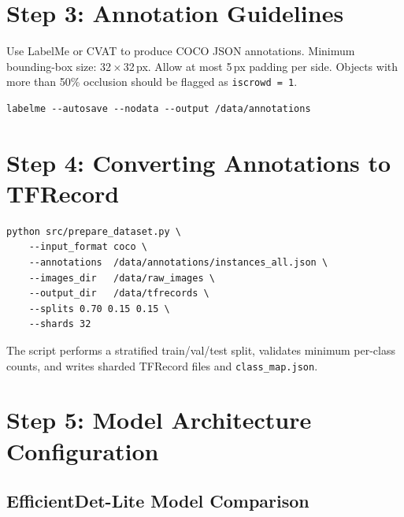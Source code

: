 \documentclass[11pt,a4paper]{article}
\begin{document}
\section{Step 3: Annotation Guidelines}

Use LabelMe or CVAT to produce COCO JSON annotations.
Minimum bounding-box size: 32\,$\times$\,32\,px. Allow at most 5\,px padding per
side. Objects with more than 50\% occlusion should be flagged as \texttt{iscrowd~=~1}.

\begin{lstlisting}[style=bash, caption={Launch LabelMe for annotation}]
labelme --autosave --nodata --output /data/annotations
\end{lstlisting}

\section{Step 4: Converting Annotations to TFRecord}

\begin{lstlisting}[style=bash, caption={Run prepare\_dataset.py with COCO input}]
python src/prepare_dataset.py \
    --input_format coco \
    --annotations  /data/annotations/instances_all.json \
    --images_dir   /data/raw_images \
    --output_dir   /data/tfrecords \
    --splits 0.70 0.15 0.15 \
    --shards 32
\end{lstlisting}

The script performs a stratified train/val/test split, validates minimum per-class
counts, and writes sharded TFRecord files and \texttt{class\_map.json}.

\section{Step 5: Model Architecture Configuration}

\subsection{EfficientDet-Lite Model Comparison}
\end{document}
